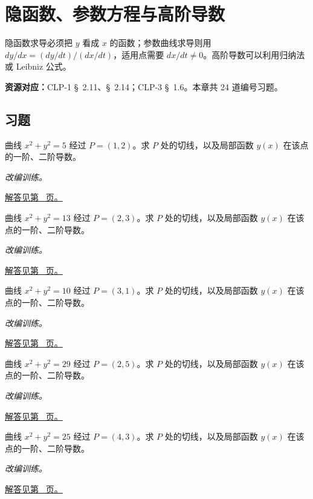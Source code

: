 \documentclass[UTF8,12pt,a4paper,fontset=fandol]{ctexart}
\begin{document}
\clearpage
\section{隐函数、参数方程与高阶导数}\label{sec:ch9}
隐函数求导必须把 $y$ 看成 $x$ 的函数；参数曲线求导则用 $dy/dx=(dy/dt)/(dx/dt)$，适用点需要 $dx/dt\ne0$。高阶导数可以利用归纳法或 Leibniz 公式。

\textbf{资源对应：}CLP-1 \S~2.11、\S~2.14；CLP-3 \S~1.6。本章共 24 道编号习题。
\subsection{习题}
\begin{example}[圆的隐函数导数]\label{ex:c9q1}
曲线 $x^2+y^2=5$ 经过 $P=(1,2)$。求 $P$ 处的切线，以及局部函数 $y(x)$ 在该点的一阶、二阶导数。
\par\textit{改编训练。}\par\hyperref[ans:c9q1]{解答见第~\pageref{ans:c9q1} 页。}
\end{example}
\begin{example}[圆的隐函数导数]\label{ex:c9q2}
曲线 $x^2+y^2=13$ 经过 $P=(2,3)$。求 $P$ 处的切线，以及局部函数 $y(x)$ 在该点的一阶、二阶导数。
\par\textit{改编训练。}\par\hyperref[ans:c9q2]{解答见第~\pageref{ans:c9q2} 页。}
\end{example}
\begin{example}[圆的隐函数导数]\label{ex:c9q3}
曲线 $x^2+y^2=10$ 经过 $P=(3,1)$。求 $P$ 处的切线，以及局部函数 $y(x)$ 在该点的一阶、二阶导数。
\par\textit{改编训练。}\par\hyperref[ans:c9q3]{解答见第~\pageref{ans:c9q3} 页。}
\end{example}
\begin{example}[圆的隐函数导数]\label{ex:c9q4}
曲线 $x^2+y^2=29$ 经过 $P=(2,5)$。求 $P$ 处的切线，以及局部函数 $y(x)$ 在该点的一阶、二阶导数。
\par\textit{改编训练。}\par\hyperref[ans:c9q4]{解答见第~\pageref{ans:c9q4} 页。}
\end{example}
\begin{example}[圆的隐函数导数]\label{ex:c9q5}
曲线 $x^2+y^2=25$ 经过 $P=(4,3)$。求 $P$ 处的切线，以及局部函数 $y(x)$ 在该点的一阶、二阶导数。
\par\textit{改编训练。}\par\hyperref[ans:c9q5]{解答见第~\pageref{ans:c9q5} 页。}
\end{example}
\end{document}
